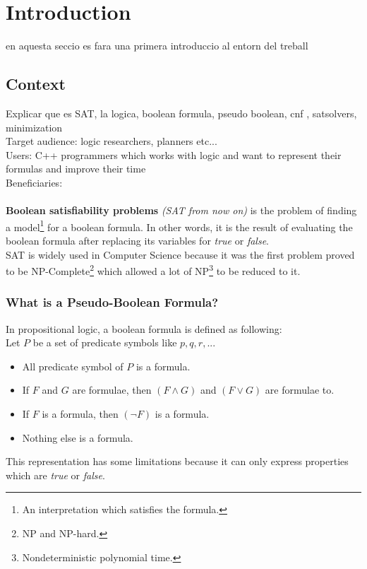 \chapter{Introduction} %

\label{Chapter1} %

en aquesta seccio es fara una primera introduccio al entorn del treball

\section{Context}

Explicar que es SAT, la logica, boolean formula, pseudo boolean, cnf , satsolvers, minimization\\
Target audience: logic researchers, planners etc...\\
Users: C++ programmers which works with logic and want to represent their formulas and improve their time\\
Beneficiaries:\\
\\
\textbf{Boolean satisfiability problems} \textit{(SAT from now on)} is the problem of finding a model\footnote{An interpretation which satisfies the formula.} for a boolean formula. In other words, it is the result of evaluating the boolean formula after replacing its variables for \emph{true} or \emph{false}. 
\\
SAT is widely used in Computer Science because it was the first problem proved to be NP-Complete\cite{Cook1971}\footnote{NP and NP-hard.} which allowed a lot of NP\footnote{Nondeterministic polynomial time.} to be reduced to it.

\subsection{What is a Pseudo-Boolean Formula?}
In propositional logic, a boolean formula is defined as following\cite{Lpo}:\\
Let $P$ be a set of predicate symbols like $p,q,r,...$
\begin{itemize}
	\item All predicate symbol of $P$ is a formula.
	\item If $F$ and $G$ are formulae, then $(F \land G)$ and $(F \lor G)$ are formulae to.
	\item If $F$ is a formula, then $(\neg F)$ is a formula.
	\item Nothing else is a formula.
\end{itemize}
This representation has some limitations because it can only express properties which are \emph{true} or \emph{false}.\\


